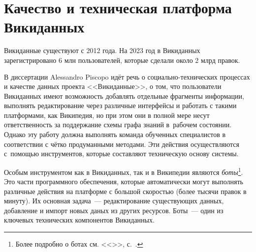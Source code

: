 \section{Качество и техническая платформа Викиданных}

Викиданные существуют с 2012 года. 
На 2023 год в Викиданных зарегистрировано 6 млн пользователей, которые сделали около 2 млрд правок.

В диссертации Alessandro Piscopo\autocite{Piscopo} идёт речь 
о социально-технических процессах и качестве данных проекта <<Викиданные>>, 
о том, что пользователи Викиданных имеют возможность добавлять отдельные фрагменты информации, 
выполнять редактирование через различные интерфейсы 
и работать с такими платформами, как Википедия, 
но при этом они в полной мере несут ответственность за поддержание схемы 
графа знаний\autocite{Knowledge_Graphs} в~рабочем состоянии. 
Однако эту работу должна выполнять команда обученных специалистов 
в соответствии с чётко продуманными методами. 
Эти действия осуществляются с~помощью инструментов, которые составляют техническую основу системы.


Особым инструментом как в Викиданных, так и в Википедии являются \emph{боты}\footnote{%
%
Более подробно о ботах см. <<>>, с.~\pageref{ch:bots}.%
%
}. Это части программного обеспечения, которые автоматически могут выполнять 
различные действия на платформе с большой скоростью (более тысячи правок в минуту). 
Их основная задача~--- редактирование существующих данных, добавление и импорт новых даных из других ресурсов. 
Боты~--- один из ключевых технических компонентов Викиданных. 

